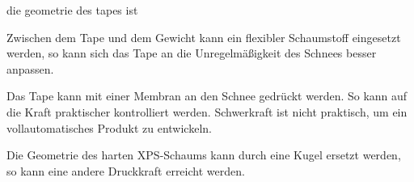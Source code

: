 die geometrie des tapes ist



Zwischen dem Tape und dem Gewicht kann ein flexibler Schaumstoff eingesetzt werden, so kann sich das Tape an die Unregelmäßigkeit des Schnees besser anpassen.

Das Tape kann mit einer Membran an den Schnee gedrückt werden. So kann auf die Kraft praktischer kontrolliert werden. Schwerkraft ist nicht praktisch, um ein vollautomatisches Produkt zu entwickeln.

Die Geometrie des harten XPS-Schaums kann durch eine Kugel ersetzt werden, so kann eine andere Druckkraft erreicht werden.
